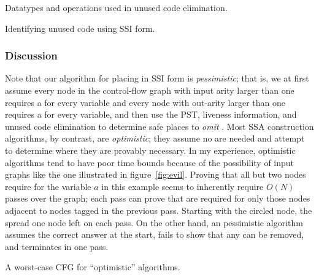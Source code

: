 \documentclass[12pt,titlepage,twoside]{article}
\newcommand*{\figscale}{1.0}
\begin{document}
\begin{myfigure}\small

\caption{Datatypes and operations used in unused code elimination.}
\label{fig:deaddata}
\end{myfigure}

\begin{myalgorithm}\small\linespread{0.75}

\caption{Identifying unused code using SSI form.}
\label{alg:deadalg}
\end{myalgorithm}

\subsubsection{Discussion}
Note that our algorithm for placing  in
SSI form is
\emph{pessimistic}; that is, we at first assume every node in the
control-flow graph with input arity larger than one requires a
\phifunction{} for every variable and every node with out-arity larger
than one requires a \sigfunction{} for every variable, and then use
the PST, liveness information, and unused code elimination to
determine safe places to
\emph{omit} .  Most SSA construction
algorithms, by contrast, are \emph{optimistic}; they assume no
 are needed and attempt to determine where
they are provably necessary.  In my experience, optimistic algorithms tend to
have poor time bounds because of the possibility of input graphs like
the one illustrated in figure~\vref{fig:evil}.
Proving that all but two nodes require
 for the variable $a$ in this example seems to
inherently require $O(N)$ passes over the graph; each pass can prove
that  are required for only those nodes adjacent to
nodes tagged in the previous pass.  Starting with the circled node, the
 spread one node left on each pass. On the other hand,
an pessimistic algorithm assumes the correct answer at the start, fails
to show that any  can be removed, and
terminates in one pass.

\begin{myfigure}[t]
\centering\renewcommand*{\figscale}{0.25}
\caption{A worst-case CFG for ``optimistic'' algorithms.}
\label{fig:evil}
\end{myfigure}
\end{document}
